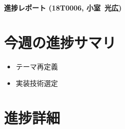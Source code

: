 \documentclass[11pt,a4paper]{jsarticle}
\def\stdid{18T0006}		%
\def\sirname{小室}		%
\def\firstname{光広}		%
\begin{document}

\noindent
\textbf{\large 進捗レポート (\stdid, \sirname\ \firstname)}		%

\section*{今週の進捗サマリ}			%

\begin{itemize}
\item テーマ再定義
\item 実装技術選定
\end{itemize}

\section{進捗詳細}					%
\end{document}
